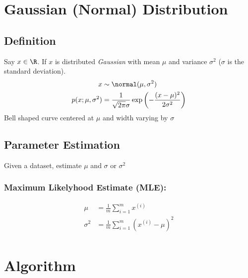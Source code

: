\section{Gaussian (Normal) Distribution}
\subsection{Definition}
Say $x \in \R$. If $x$ is distributed \emph{Gaussian} with mean $\mu$ and variance
$\sigma^2$ ($\sigma$ is the standard deviation).
\begin{align*}
    x                   & \sim \normal(\mu, \sigma^2)   \\
    p(x; \mu, \sigma^2) & = \frac{1}{\sqrt{2\pi}\sigma}
    \exp\left(-\frac{(x-\mu)^2}{2\sigma^2}\right)       \\
\end{align*}
Bell shaped curve centered at $\mu$ and width varying by $\sigma$

\subsection{Parameter Estimation}
Given a dataset, estimate $\mu$ and $\sigma$ or $\sigma^2$

\subsubsection{Maximum Likelyhood Estimate (MLE):}
\begin{align*}
    \mu      & = \frac{1}{m}\sum_{i=1}^m x^{(i)}          \\
    \sigma^2 & = \frac{1}{m}\sum_{i=1}^m(x^{(i)} - \mu)^2 \\
\end{align*}

\section{Algorithm}
